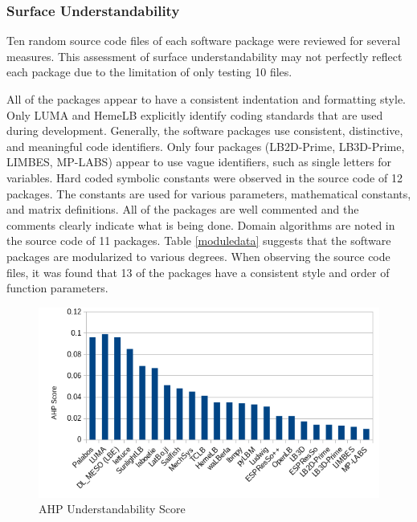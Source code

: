 \documentclass[12pt, notitlepage]{article}
\begin{document}
\subsubsection{Surface Understandability}

Ten random source code files of each software package were reviewed for several measures. This assessment of surface understandability may not perfectly reflect each package due to the limitation of only testing 10 files. 

All of the packages appear to have a consistent indentation and formatting style. Only LUMA and HemeLB explicitly identify coding standards that are used during development. Generally, the software packages use consistent, distinctive, and meaningful code identifiers. Only four packages (LB2D-Prime, LB3D-Prime, LIMBES, MP-LABS) appear to use vague identifiers, such as single letters for variables. Hard coded symbolic constants were observed in the source code of 12 packages. The constants are used for various parameters, mathematical constants, and matrix definitions. All of the packages are well commented and the comments clearly indicate what is being done. Domain algorithms are noted in the source code of 11 packages. Table \ref{moduledata} suggests that the software packages are modularized to various degrees. When observing the source code files, it was found that 13 of the packages have a consistent style and order of function parameters.

\begin{figure}[h!]
	\begin{center}
		\includegraphics[width=1.0\textwidth]{understandability_chart}
		\caption{AHP Understandability Score}
		\label{Fig_Understandability}
	\end{center}
\end{figure}
\end{document}

